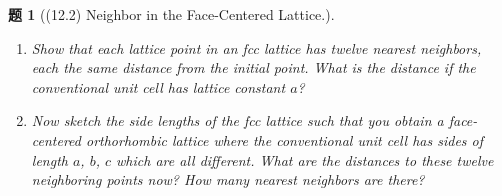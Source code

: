 \documentclass[UTF8,10pt,a4paper]{article}
\theoremstyle{Problem}
\newtheorem{prob}{题}
\theoremstyle{Solution}
\begin{document}
\thispagestyle{FirstPageStyle}
\begin{prob}[(12.2) Neighbor in the Face-Centered Lattice.]
    \begin{enumerate}
        \item[(a)] Show that each lattice point in an fcc lattice has twelve nearest neighbors, each the same distance from the initial point. What is the distance if the conventional unit cell has lattice constant $a$?
        \item[(b)$^*$] Now sketch the side lengths of the fcc lattice such that you obtain a face-centered orthorhombic lattice where the conventional unit cell has sides of length $a$, $b$, $c$ which are all different. What are the distances to these twelve neighboring points now? How many nearest neighbors are there?
    \end{enumerate}
\end{prob}
\end{document}
